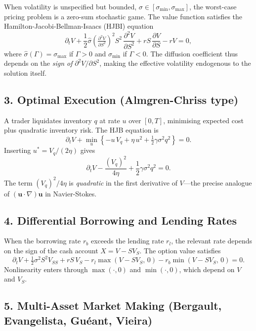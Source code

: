 \documentclass[11pt,a4paper]{article}
\begin{document}
When volatility is unspecified but bounded, $\sigma \in [\sigma_{\min}, \sigma_{\max}]$, the worst-case
pricing problem is a zero-sum stochastic game. The value function satisfies the
Hamilton-Jacobi-Bellman-Isaacs (HJBI) equation
\[
  \partial_t V + \frac{1}{2}\hat{\sigma}\!\left(\tfrac{\partial^2 V}{\partial S^2}\right)^{\!2}
  S^2\,\frac{\partial^2 V}{\partial S^2} + rS\,\frac{\partial V}{\partial S} - rV = 0,
\]
where $\hat{\sigma}(\Gamma) = \sigma_{\max}$ if $\Gamma > 0$ and $\sigma_{\min}$ if $\Gamma < 0$. The
diffusion coefficient thus depends on the \emph{sign of} $\partial^2 V/\partial S^2$, making the effective
volatility endogenous to the solution itself.

\subsection*{3. Optimal Execution (Almgren-Chriss type)}

A trader liquidates inventory $q$ at rate $u$ over $[0,T]$, minimising expected cost plus quadratic
inventory risk. The HJB equation is
\[
  \partial_t V + \min_{u}\!\left\{
    -u\,V_q + \eta\, u^2 + \tfrac{1}{2}\gamma\sigma^2 q^2
  \right\} = 0.
\]
Inserting $u^* = V_q/(2\eta)$ gives
\[
  \partial_t V - \frac{(V_q)^2}{4\eta} + \frac{1}{2}\gamma\sigma^2 q^2 = 0.
\]
The term $(V_q)^2/4\eta$ is \emph{quadratic} in the first derivative of $V$---the precise analogue of
$(\mathbf{u}\cdot\nabla)\mathbf{u}$ in Navier-Stokes.

\subsection*{4. Differential Borrowing and Lending Rates}

When the borrowing rate $r_b$ exceeds the lending rate $r_l$, the relevant rate depends on the sign of the
cash account $X = V - SV_S$. The option value satisfies
\[
  \partial_t V + \tfrac{1}{2}\sigma^2 S^2 V_{SS} + rS\,V_S
  - r_l\max(V - SV_S,\,0) - r_b\min(V - SV_S,\,0) = 0.
\]
Nonlinearity enters through $\max(\cdot,0)$ and $\min(\cdot,0)$, which depend on $V$ and $V_S$.

\subsection*{5. Multi-Asset Market Making (Bergault, Evangelista, Gu\'eant, Vieira)}
\end{document}
